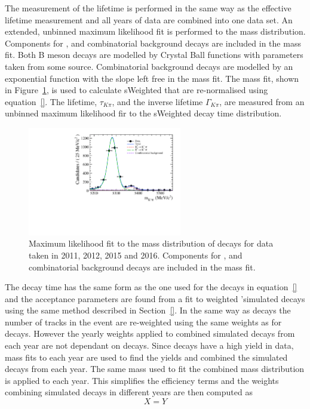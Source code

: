 The measurement of the \bdki lifetime is performed in the same way as the \bsmumu effective lifetime measurement and all years of data are combined into one data set. An extended, unbinned maximum likelihood fit is performed to the \bdkpi mass distribution. Components for \bdkpi, \bskpi and combinatorial background decays are included in the mass fit. Both B meson decays are modelled by Crystal Ball functions with parameters taken from some source. Combinatorial background decays are modelled by an exponential function with the slope left free in the mass fit. The mass fit, shown in Figure~\ref{fig:bdkpimassfit}, is used to calculate sWeighted that are re-normalised using equation~\ref{}. The lifetime, $\tau_{K\pi}$, and the inverse lifetime $\Gamma_{K\pi}$, are measured from an unbinned maximum likelihood fir to the sWeighted decay time distribution. 

\begin{figure}[htbp]
\centering
  \includegraphics[width=0.6\textwidth]{./Figs/LifetimeSystematics/Bd2KPi_mass_fit.pdf}
\caption{Maximum likelihood fit to the mass distribution of \bdkpi decays for data taken in 2011, 2012, 2015 and 2016. Components for \bdkpi, \bskpi and combinatorial background decays are included in the mass fit. }
\label{fig:bdkpimassfit}
\end{figure}


The decay time \pdf has the same form as the one used for the \bsmumu decays in equation~\ref{} and the acceptance parameters are found from a fit to weighted '\bdkpi simulated decays using the same method described in Section~\ref{}. In the same way as \bsmumu decays the number of tracks in the event are re-weighted using the same weights as for \bsmumu decays. However the yearly weights applied to combined simulated \bdkpi decays from each year are not dependant on \bsjpsiphi decays. Since \bdkpi decays have a high yield in data, mass fits to each year are used to find the yields and combined the simulated decays from each year. The same mass \pdf used to fit the combined mass distribution is applied to each year. This simplifies the efficiency terms and the weights combining simulated decays in different years are then computed as
\begin{equation}
X = Y
\end{equation}

